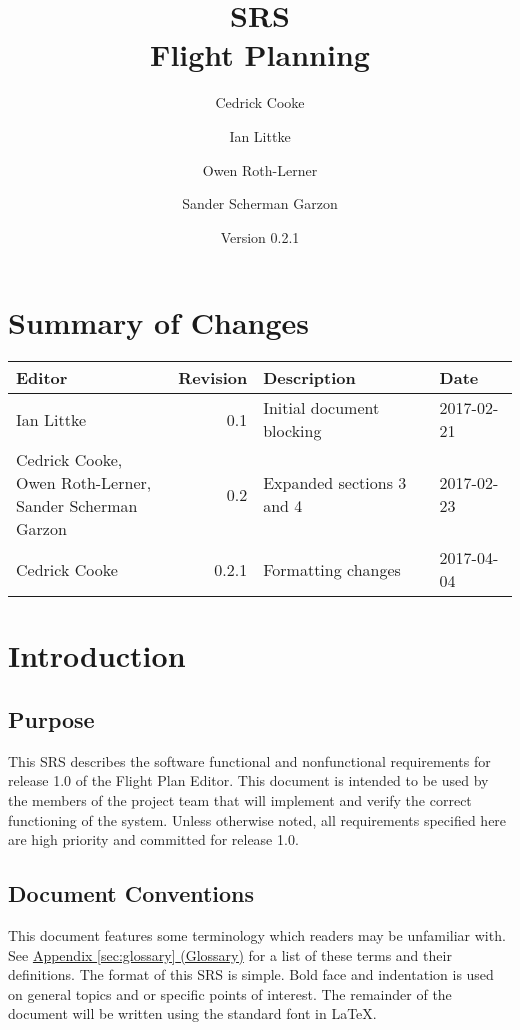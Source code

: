 \documentclass[12pt, letterpaper]{article}
\title{SRS \\
Flight Planning
}
\author{ Cedrick Cooke
    \and Ian Littke
    \and Owen Roth-Lerner
    \and Sander Scherman Garzon
}
\date{Version 0.2.1}
\begin{document}
\maketitle
\pagebreak

\tableofcontents

\section*{Summary of Changes}
\begin{tabularx}{\textwidth}{|l|r|X|l|} \hline
Editor & Revision & Description & Date \\ \hline \hline
Ian Littke & 0.1 & Initial document blocking & 2017-02-21 \\ \hline
\makecell[cl]{Cedrick Cooke,\\ Owen Roth-Lerner,\\ Sander Scherman Garzon} & 0.2 & Expanded sections 3 and 4 & 2017-02-23 \\ \hline
Cedrick Cooke & 0.2.1 & Formatting changes & 2017-04-04 \\ \hline
\end{tabularx}

\pagebreak
\section{Introduction}
\subsection{Purpose}
This SRS describes the software functional and nonfunctional requirements for release 1.0 of the Flight Plan Editor.
This document is intended to be used by the members of the project team that will implement and verify the correct functioning of the system.
Unless otherwise noted, all requirements specified here are high priority and committed for release 1.0.

\subsection{Document Conventions}
This document features some terminology which readers may be unfamiliar with.
See \hyperref[sec:glossary]{Appendix \ref{sec:glossary} (Glossary)} for a list of these terms and their definitions.
The format of this SRS is simple. Bold face and indentation is used on general topics and or specific points of interest.
The remainder of the document will be written using the standard font in \LaTeX.
\end{document}
